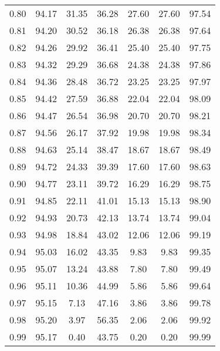 \begin{tabular}{|c|c|c|c|c|c|c|}
      0.80 &     94.17 &     31.35 &      36.28 &   27.60 &      27.60 &         97.54 \\
      0.81 &     94.20 &     30.52 &      36.18 &   26.38 &      26.38 &         97.64 \\
      0.82 &     94.26 &     29.92 &      36.41 &   25.40 &      25.40 &         97.75 \\
      0.83 &     94.32 &     29.29 &      36.68 &   24.38 &      24.38 &         97.86 \\
      0.84 &     94.36 &     28.48 &      36.72 &   23.25 &      23.25 &         97.97 \\
      0.85 &     94.42 &     27.59 &      36.88 &   22.04 &      22.04 &         98.09 \\
      0.86 &     94.47 &     26.54 &      36.98 &   20.70 &      20.70 &         98.21 \\
      0.87 &     94.56 &     26.17 &      37.92 &   19.98 &      19.98 &         98.34 \\
      0.88 &     94.63 &     25.14 &      38.47 &   18.67 &      18.67 &         98.49 \\
      0.89 &     94.72 &     24.33 &      39.39 &   17.60 &      17.60 &         98.63 \\
      0.90 &     94.77 &     23.11 &      39.72 &   16.29 &      16.29 &         98.75 \\
      0.91 &     94.85 &     22.11 &      41.01 &   15.13 &      15.13 &         98.90 \\
      0.92 &     94.93 &     20.73 &      42.13 &   13.74 &      13.74 &         99.04 \\
      0.93 &     94.98 &     18.84 &      43.02 &   12.06 &      12.06 &         99.19 \\
      0.94 &     95.03 &     16.02 &      43.35 &    9.83 &       9.83 &         99.35 \\
      0.95 &     95.07 &     13.24 &      43.88 &    7.80 &       7.80 &         99.49 \\
      0.96 &     95.11 &     10.36 &      44.99 &    5.86 &       5.86 &         99.64 \\
      0.97 &     95.15 &      7.13 &      47.16 &    3.86 &       3.86 &         99.78 \\
      0.98 &     95.20 &      3.97 &      56.35 &    2.06 &       2.06 &         99.92 \\
      0.99 &     95.17 &      0.40 &      43.75 &    0.20 &       0.20 &         99.99 \\
\bottomrule
\end{tabular}
